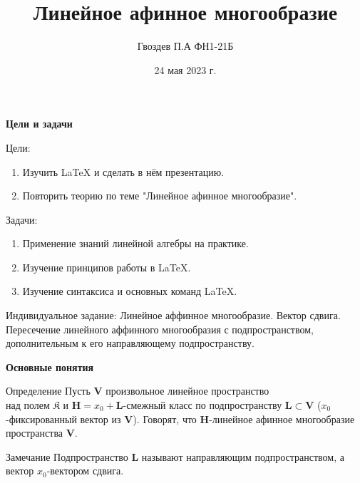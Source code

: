 \documentclass{beamer}
\title[Линейное афинное многообразие]{\textbf{Линейное афинное многообразие}}
\author{Гвоздев П.А ФН1-21Б}
\date{24 мая 2023 г.}
\begin{document}
\frame{\titlepage}



\begin{frame}{\textbf{Цели и задачи}}
\begin{block}{Цели:}
\begin{enumerate}
    \item Изучить LaTeX и сделать в нём презентацию.
    \item Повторить теорию по теме "Линейное афинное многообразие".
\end{enumerate}
\end{block}
\begin{block}{Задачи:}
\begin{enumerate}
    \item Применение знаний линейной алгебры на практике.
    \item Изучение принципов работы в LaTeX.
    \item Изучение синтаксиса и основных команд LaTeX.
\end{enumerate}
\end{block}
\begin{block}{Индивидуальное задание:}
    Линейное аффинное многообразие. Вектор сдвига. Пересечение линейного аффинного многообразия с подпространством, дополнительным к его направляющему подпространству.
\end{block}
\end{frame}




\begin{frame}{\textbf{Основные понятия}}

\begin{block}{Определение}
Пусть $\mathbf{V}$ произвольное линейное пространство\\
над полем $\mathfrak{K}$ и $\mathbf{H}=x_0+\mathbf{L}$-смежный класс по подпространству $\mathbf{L}\subset \mathbf{V}$ ($x_0$-фиксированный  вектор из $\mathbf{V}$). Говорят, что $\mathbf{H}$-линейное афинное многообразие пространства $\mathbf{V}$.
\end{block}

\begin{block}{Замечание}
Подпространство $\mathbf{L}$ называют направляющим подпространством,
а вектор $x_0$-вектором сдвига.
\end{block}


\end{frame}
\end{document}

